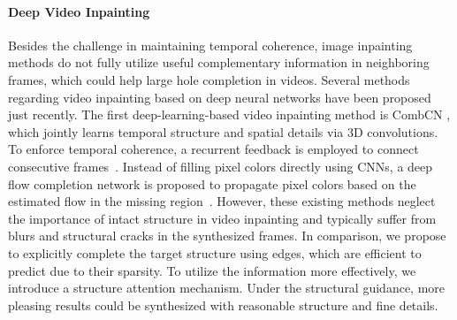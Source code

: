 \paragraph{Deep Video Inpainting}
Besides the challenge in maintaining temporal coherence, image inpainting methods do not fully utilize useful complementary information in neighboring frames, which could help large hole completion in videos.
Several methods regarding video inpainting based on deep neural networks have been proposed just recently.
%
The first deep-learning-based video inpainting method is CombCN \cite{wang2019video}, which jointly learns temporal structure and spatial details via 3D convolutions.
%
To enforce temporal coherence, a recurrent feedback is employed to connect consecutive frames~\cite{Kim_2019_CVPR,Kim_2019_CVPR1}. 
Instead of filling pixel colors directly using CNNs, a deep flow completion network is proposed to propagate pixel colors based on the estimated flow in the missing region~\cite{Xu_2019_CVPR}.
%
However, these existing methods neglect the importance of intact structure in video inpainting and typically suffer from blurs and structural cracks in the synthesized frames.  
In comparison, we propose to explicitly complete the target structure using edges, which are efficient to predict due to their sparsity. To utilize the information more effectively, we introduce a structure attention mechanism. 
Under the structural guidance, more pleasing results could be synthesized with reasonable structure and fine details. 






























